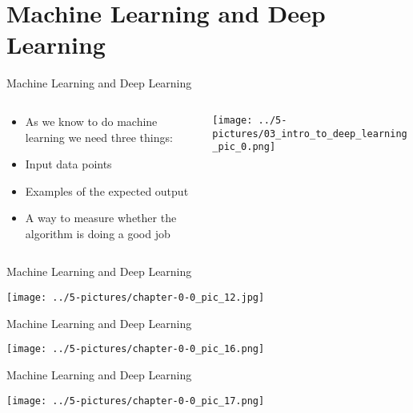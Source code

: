 \documentclass[11pt]{beamer}
\begin{document}
\section{Machine Learning and Deep Learning}
\begin{frame}{Machine Learning and Deep Learning}
\begin{columns}[T] %
\begin{column}{.48\textwidth}
        \begin{itemize}
		\item As we know to do machine learning we need three things:
		\item Input data points
		\item Examples of the expected output
		\item A way to measure whether the algorithm is doing a good job
        \end{itemize}
\end{column}%
\hfill%
\begin{column}{.48\textwidth}
        \texttt{[image: ../5-pictures/03\_intro\_to\_deep\_learning\_pic\_0.png]}
\end{column}%
\end{columns}
\end{frame}
\begin{frame}{Machine Learning and Deep Learning}
\begin{center}
\texttt{[image: ../5-pictures/chapter-0-0\_pic\_12.jpg]} 
\end{center}
\end{frame}
\begin{frame}{Machine Learning and Deep Learning}
\begin{center}
\texttt{[image: ../5-pictures/chapter-0-0\_pic\_16.png]} 
\end{center}
\end{frame}
\begin{frame}{Machine Learning and Deep Learning}
\begin{center}
\texttt{[image: ../5-pictures/chapter-0-0\_pic\_17.png]} 
\end{center}
\end{frame}
\end{document}
